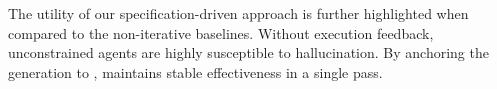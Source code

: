 The utility of our specification-driven approach is further highlighted when compared to the non-iterative baselines. Without execution feedback, unconstrained agents are highly susceptible to hallucination. By anchoring the generation to \plantree{}, \methodname{} maintains stable effectiveness in a single pass. 



